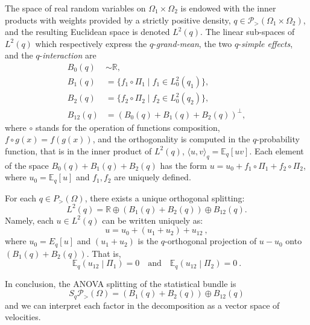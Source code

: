 \documentclass[axioms,article,submit,pdftex,moreauthors]{Definitions/mdpi}
\theoremstyle{plain}
\theoremstyle{remark}
\newcommand{\Expectation}{\mathbb E}
\newcommand{\condexpat}[3]{\Expectation_{#1}\left(#2 \middle| #3\right)}
\newcommand{\expfibreat}[2]{S_{#1}\pdensitieson{#2}}
\newcommand{\pdensitieson}[1]{\mathcal P_{>}\left(#1\right)}
\begin{document}
 The space of real random variables on $\Omega_1 \times \Omega_2$ is endowed with the inner products with weights provided by a strictly positive density, $q \in \pdensitieson{\Omega_1 \times \Omega_2}$, and the resulting Euclidean space is denoted $L^2(q)$. The linear sub-spaces of \( L^2(q) \) which respectively express the \( q \)-\emph{grand-mean}, the two \( q \)-\emph{simple effects}, and the \( q \)-\emph{interaction} are
     \begin{align*} 
B_0(q) & \sim \mathbb{R}, \\
B_1(q) &= \{ f_1 \circ \Pi_1 \mid f_1 \in L^2_0(q_1) \}, \\
B_2(q) &= \{ f_2 \circ \Pi_2 \mid f_2 \in L^2_0(q_2) \}, \\
B_{12}(q) & = (B_0(q) + B_1(q) + B_2(q))^\perp,
     \end{align*} 
where $\circ$ stands for the operation of functions composition, $f \circ g (x) = f(g(x))$, and the orthogonality is computed in the \( q \)-probability function, that is in the inner product of \( L^2(q) \), \( \langle u, v \rangle_q = \mathbb{E}_q[uv] \). Each element of the space \( B_0(q) + B_1(q) + B_2(q) \) has the form \( u = u_0 + f_1 \circ \Pi_1 + f_2 \circ \Pi_2 \), where \( u_0 = \mathbb{E}_q[u] \) and \( f_1, f_2 \) are uniquely defined.

For each \( q \in P_> (\Omega) \), there exists a unique orthogonal splitting:
\begin{equation*} 
L^2(q) = \mathbb{R} \oplus (B_1(q) + B_2(q)) \oplus B_{12}(q).
\end{equation*} 
Namely, each \( u \in L^2(q) \) can be written uniquely as:
\begin{equation*} 
u = u_0 + (u_1 + u_2) + u_{12} \ ,
\end{equation*} 
where \( u_0 = E_q[u] \) and \( (u_1 + u_2) \) is the \( q \)-orthogonal projection of \( u - u_0 \) onto \( (B_1(q) + B_2(q)) \). That is,
\begin{equation*} 
\condexpat q {u_{12}}{\Pi_1} = 0 \quad \text{and} \quad \condexpat q {u_{12}}{\Pi_2} = 0 \ .
\end{equation*} 

In conclusion, the ANOVA splitting of the statistical bundle is
\begin{equation}  \label{eq:ANOVA-splitting}
\expfibreat q \Omega = (B_1(q) + B_2(q)) \oplus B_{12}(q) 
\end{equation}
and we can interpret each factor in the decomposition as a vector space of velocities.
\end{document}
